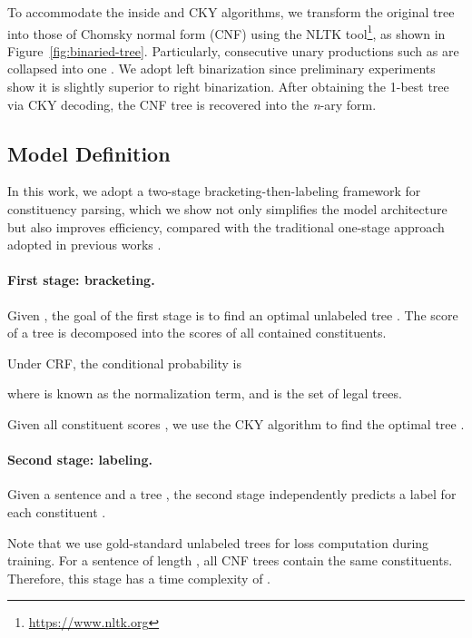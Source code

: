 \documentclass{article}
\begin{document}
To accommodate the inside and CKY algorithms, we transform the original tree into
those of Chomsky normal form (CNF) using the NLTK tool\footnote{\url{https://www.nltk.org}}, as shown in Figure~\ref{fig:binaried-tree}.
Particularly, consecutive unary productions such as  are collapsed into one .
We adopt left binarization since preliminary experiments show it is slightly superior to right binarization.
After obtaining the 1-best tree via CKY decoding, the CNF tree is recovered into the \textit{n}-ary form.




\subsection{Model Definition} \label{sec:model-defination}
\label{sub@section:model-definition}

In this work, we adopt a two-stage bracketing-then-labeling framework for constituency parsing, which we show not only simplifies the model architecture but also improves efficiency, compared with the traditional one-stage approach adopted in previous works \cite{stern-etal-2017-minimal,gaddy-etal-2018-whats}.





\paragraph{First stage: bracketing.}
Given , the goal of the first stage is to find an optimal unlabeled tree .
The score of a tree is decomposed into the scores of all contained constituents.

Under CRF, the conditional probability is

where  is known as the normalization term, and  is the set of legal trees.

Given all constituent scores , we use the CKY algorithm to find the optimal tree .







\paragraph{Second stage: labeling.}
Given a sentence  and a tree , the second stage independently predicts a label for each constituent .

Note that we use gold-standard unlabeled trees for loss computation during training.
For a sentence of length , all CNF trees contain the same  constituents. Therefore, this stage has a time complexity of .
\end{document}

